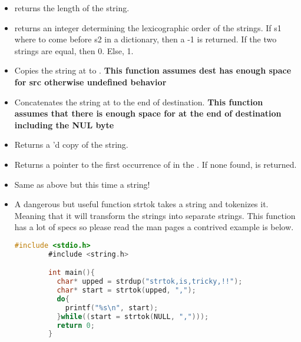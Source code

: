 \begin{itemize}

	\item {} returns the length of the string.

	\item {} returns an integer determining the lexicographic order of the strings.
    If s1 where to come before s2 in a dictionary, then a -1 is returned.
    If the two strings are equal, then 0.
    Else, 1.

	\item {} Copies the string at  to .
    \textbf{This function assumes dest has enough space for src otherwise undefined behavior}

	\item {} Concatenates the string at  to the end of destination.
    \textbf{This function assumes that there is enough space for  at the end of destination including the NUL byte}

	\item {} Returns a 'd copy of the string.

	\item {} Returns a pointer to the first occurrence of  in the .
    If none found,  is returned.

	\item {} Same as above but this time a string!

	\item {}

	  A dangerous but useful function strtok takes a string and tokenizes it.
    Meaning that it will transform the strings into separate strings.
    This function has a lot of specs so please read the man pages a contrived example is below.

	      \begin{lstlisting}[language=C]
        #include <stdio.h>
        #include <string.h>

        int main(){
          char* upped = strdup("strtok,is,tricky,!!");
          char* start = strtok(upped, ",");
          do{
            printf("%s\n", start);
          }while((start = strtok(NULL, ",")));
          return 0;
        }
\end{lstlisting}


\end{itemize}
